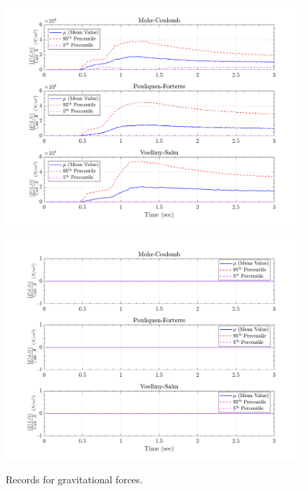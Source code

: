\documentclass{article}
\begin{document}
\begin{figure}[H]
	\begin{minipage}[b]{0.5\linewidth}
    	\centering
    	\includegraphics[width=1\textwidth]{InclinedPlane/LocalRecords/Records/Fg_L15.png}
    	\label{fig:Ramp-L3-Fg}
	\end{minipage}
	\begin{minipage}[b]{0.5\linewidth}
		\centering
		\includegraphics[width=1\textwidth]{InclinedPlane/LocalRecords/Records/Fg_L17.png}
    	\label{fig:Ramp-L4-Fg}
    \end{minipage}
    \caption{Records for gravitational forces.}
    \label{fig:Ramp-LM-Fg}     
\end{figure}
\end{document}
